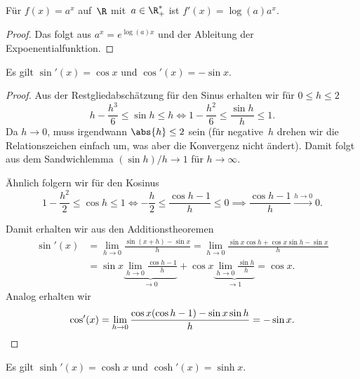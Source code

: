 \documentclass[a4paper]{article}
\begin{document}
\begin{proposition}
    Für $f(x) = a^x$ auf~$\R$ mit~$a \in \R_+^*$ ist $f'(x) = \log(a)a^x$.
\end{proposition}

\begin{proof}
    Das folgt aus $a^x = e^{\log(a)x}$ und der Ableitung der Expoenentialfunktion.
\end{proof}

\begin{proposition}
    Es gilt $\sin'(x) = \cos x$ und $\cos'(x) = -\sin x$.
\end{proposition}

\begin{proof}
    Aus der Restgliedabschätzung für den Sinus erhalten wir für $0 \leq h \leq 2$
    \begin{equation*}
        h-\frac{h^3}{6} \leq \sin h \leq h \iff 1-\frac{h^2}{6} \leq \frac{\sin h}{h} \leq 1.
    \end{equation*}
    Da $h \to 0$, muss irgendwann $\abs{h} \leq 2$ sein (für negative~$h$ drehen wir die Relationszeichen einfach um, was aber die Konvergenz nicht ändert). Damit folgt aus dem Sandwichlemma $(\sin h)/h \to 1$ für $h \to \infty$.

    Ähnlich folgern wir für den Kosinus
    \begin{equation*}
        1 - \frac{h^2}{2} \leq \cos h \leq 1 \iff -\frac{h}{2} \leq \frac{\cos h-1}{h} \leq 0 \implies \frac{\cos h-1}{h} \xrightarrow{h\to0} 0.
    \end{equation*}

    Damit erhalten wir aus den Additionstheoremen
    \begin{align*}
        \sin'(x) &= \lim_{h\to0} \frac{\sin(x+h)-\sin x}{h} = \lim_{h\to0} \frac{\sin x\cos h + \cos x\sin h - \sin x}{h} \\
        &= \sin x \underbrace{\lim_{h\to0} \frac{\cos h-1}{h}}_{\to 0} + \cos x \underbrace{\lim_{h\to0} \frac{\sin h}{h}}_{\to 1} = \cos x.
    \end{align*}
    Analog erhalten wir
    \begin{equation*}
        \cos'(x) = \lim_{h\to0} \frac{\cos x(\cos h-1) - \sin x\sin h}{h} = -\sin x. \qedhere
    \end{equation*}
\end{proof}

\begin{proposition}
    Es gilt $\sinh'(x) = \cosh x$ und $\cosh'(x) = \sinh x$.
\end{proposition}
\end{document}
